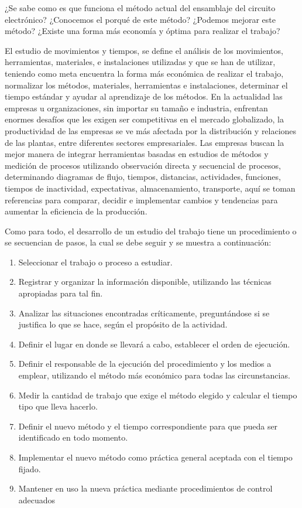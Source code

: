     
    ¿Se sabe como es que funciona el método actual del ensamblaje del circuito electrónico? ¿Conocemos el porqué de este método? ¿Podemos mejorar este método? ¿Existe una forma más economía y óptima para realizar el trabajo?
    
    El estudio de movimientos y tiempos, se define el análisis de los movimientos, herramientas, materiales, e instalaciones utilizadas y que se han de utilizar, teniendo como meta encuentra la forma más económica de realizar el trabajo, normalizar los métodos, materiales, herramientas e instalaciones, determinar el tiempo estándar y ayudar al aprendizaje de los métodos. En la actualidad las empresas u organizaciones, sin importar su tamaño e industria, enfrentan enormes desafíos que les exigen ser competitivas en el mercado globalizado, la productividad de las empresas se ve más afectada por la distribución y relaciones de las plantas, entre diferentes sectores empresariales. Las empresas buscan la mejor manera de integrar herramientas basadas en estudios de métodos y medición de procesos utilizando observación directa y secuencial de procesos, determinando diagramas de flujo, tiempos, distancias, actividades, funciones, tiempos de inactividad, expectativas, almacenamiento, transporte, aquí se toman referencias para comparar, decidir e implementar cambios y tendencias para aumentar la eficiencia de la producción.
    
    Como para todo, el desarrollo de un estudio del trabajo tiene un procedimiento o se secuencian de pasos, la cual se debe seguir y se muestra a continuación: 
    
    
     \begin{enumerate}
         \item Seleccionar el trabajo o proceso a estudiar. 
         \item Registrar  y  organizar  la  información  disponible,  utilizando  las técnicas apropiadas para tal fin. 
         \item Analizar las situaciones encontradas críticamente,  preguntándose si se justifica lo que se hace, según el propósito de la actividad. 
         \item Definir el  lugar en donde  se llevará a  cabo, establecer el  orden de ejecución. 
         \item Definir el responsable de la ejecución del procedimiento y los medios a  emplear,  utilizando  el  método  más  económico  para  todas  las circunstancias.
         \item Medir la cantidad de trabajo que exige el método elegido y calcular el tiempo tipo que lleva hacerlo.
         \item Definir el nuevo método y el tiempo correspondiente para que pueda ser identificado en todo momento. 
         \item Implementar el nuevo método  como práctica general aceptada  con el tiempo fijado. 
         \item Mantener  en  uso  la  nueva  práctica mediante  procedimientos  de control adecuados \cite{niebel1980ingenieria}
     \end{enumerate}
    
